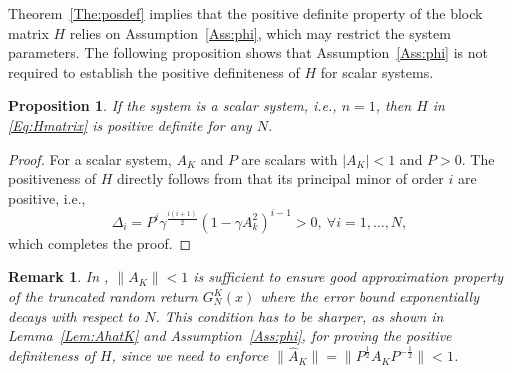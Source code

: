 \documentclass[letterpaper, 10 pt, conference]{ieeeconf}  %
\newtheorem{proposition}{Proposition}[section]
\newtheorem{remark}{Remark}[section]
\begin{document}
Theorem~\ref{The:posdef}  implies that the positive definite property of the block matrix $H$ relies on Assumption~\ref{Ass:phi}, which may restrict the system parameters. The following proposition shows that  Assumption~\ref{Ass:phi} is not required to establish the positive definiteness of $H$ for scalar systems. 
\begin{proposition}
    If the system is a scalar system, 
    i.e., $n=1$, then $H$ in \eqref{Eq:Hmatrix} is positive definite for any $N$. 
\end{proposition}
\begin{proof}
For a scalar system, $A_K$ and $P$ are scalars with $|A_K|<1$ and $P>0$. The positiveness of $H$ directly follows from that its principal minor of order $i$ are positive, i.e.,
   $$ \Delta_i=P^i \gamma^{\frac{i(i+1)}{2}}(1-\gamma A_k^2)^{i-1}>0, \ \forall i=1,\ldots,N,$$
   which completes the proof. 
\end{proof}

\begin{remark}
In \cite{wang2023policy}, $\|A_K\|<1$ is sufficient to ensure good  approximation property of the truncated random return $G^K_N(x)$ where the error bound exponentially decays with respect to $N$.  This condition has to be sharper, as shown in Lemma~\ref{Lem:AhatK} and Assumption~\ref{Ass:phi}, for proving the positive definiteness of $H$, since we need to enforce $\|\hat{A}_K\|=\|P^{\frac{1}{2}}A_KP^{-\frac{1}{2}}\|<1$.  
\end{remark}
\end{document}
